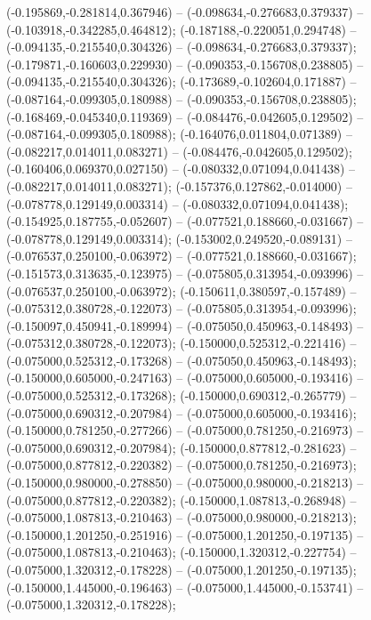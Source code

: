  (-0.195869,-0.281814,0.367946) -- (-0.098634,-0.276683,0.379337) -- (-0.103918,-0.342285,0.464812);
 (-0.187188,-0.220051,0.294748) -- (-0.094135,-0.215540,0.304326) -- (-0.098634,-0.276683,0.379337);
 (-0.179871,-0.160603,0.229930) -- (-0.090353,-0.156708,0.238805) -- (-0.094135,-0.215540,0.304326);
 (-0.173689,-0.102604,0.171887) -- (-0.087164,-0.099305,0.180988) -- (-0.090353,-0.156708,0.238805);
 (-0.168469,-0.045340,0.119369) -- (-0.084476,-0.042605,0.129502) -- (-0.087164,-0.099305,0.180988);
 (-0.164076,0.011804,0.071389) -- (-0.082217,0.014011,0.083271) -- (-0.084476,-0.042605,0.129502);
 (-0.160406,0.069370,0.027150) -- (-0.080332,0.071094,0.041438) -- (-0.082217,0.014011,0.083271);
 (-0.157376,0.127862,-0.014000) -- (-0.078778,0.129149,0.003314) -- (-0.080332,0.071094,0.041438);
 (-0.154925,0.187755,-0.052607) -- (-0.077521,0.188660,-0.031667) -- (-0.078778,0.129149,0.003314);
 (-0.153002,0.249520,-0.089131) -- (-0.076537,0.250100,-0.063972) -- (-0.077521,0.188660,-0.031667);
 (-0.151573,0.313635,-0.123975) -- (-0.075805,0.313954,-0.093996) -- (-0.076537,0.250100,-0.063972);
 (-0.150611,0.380597,-0.157489) -- (-0.075312,0.380728,-0.122073) -- (-0.075805,0.313954,-0.093996);
 (-0.150097,0.450941,-0.189994) -- (-0.075050,0.450963,-0.148493) -- (-0.075312,0.380728,-0.122073);
 (-0.150000,0.525312,-0.221416) -- (-0.075000,0.525312,-0.173268) -- (-0.075050,0.450963,-0.148493);
 (-0.150000,0.605000,-0.247163) -- (-0.075000,0.605000,-0.193416) -- (-0.075000,0.525312,-0.173268);
 (-0.150000,0.690312,-0.265779) -- (-0.075000,0.690312,-0.207984) -- (-0.075000,0.605000,-0.193416);
 (-0.150000,0.781250,-0.277266) -- (-0.075000,0.781250,-0.216973) -- (-0.075000,0.690312,-0.207984);
 (-0.150000,0.877812,-0.281623) -- (-0.075000,0.877812,-0.220382) -- (-0.075000,0.781250,-0.216973);
 (-0.150000,0.980000,-0.278850) -- (-0.075000,0.980000,-0.218213) -- (-0.075000,0.877812,-0.220382);
 (-0.150000,1.087813,-0.268948) -- (-0.075000,1.087813,-0.210463) -- (-0.075000,0.980000,-0.218213);
 (-0.150000,1.201250,-0.251916) -- (-0.075000,1.201250,-0.197135) -- (-0.075000,1.087813,-0.210463);
 (-0.150000,1.320312,-0.227754) -- (-0.075000,1.320312,-0.178228) -- (-0.075000,1.201250,-0.197135);
 (-0.150000,1.445000,-0.196463) -- (-0.075000,1.445000,-0.153741) -- (-0.075000,1.320312,-0.178228);
